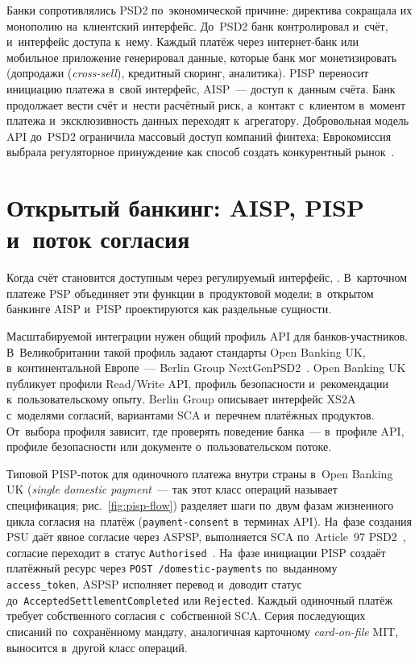Банки сопротивлялись PSD2 по~экономической причине: директива сокращала их
монополию на~клиентский интерфейс. До~PSD2 банк контролировал и~счёт,
и~интерфейс доступа к~нему. Каждый платёж через интернет-банк или мобильное
приложение генерировал данные, которые банк мог монетизировать (допродажи
(\textit{cross-sell}), кредитный скоринг, аналитика). PISP переносит инициацию
платежа в~свой интерфейс,
AISP~--- доступ к~данным счёта. Банк продолжает вести счёт и~нести расчётный
риск, а~контакт с~клиентом в~момент платежа и~эксклюзивность данных переходят
к~агрегатору. Добровольная модель API до~PSD2 ограничила массовый доступ
компаний финтеха; Еврокомиссия выбрала регуляторное принуждение
как способ создать конкурентный рынок~\cite{psd2}.

\section{Открытый банкинг: AISP, PISP и~поток согласия}\label{sec:open-banking}

Когда счёт становится доступным через регулируемый интерфейс,
. В~карточном платеже PSP
объединяет эти функции в~продуктовой модели; в~открытом банкинге AISP и~PISP
проектируются как раздельные сущности.

Масштабируемой интеграции нужен общий профиль API для банков-участников.
В~Великобритании такой профиль
задают стандарты Open Banking UK, в~континентальной Европе~--- Berlin Group
NextGenPSD2~\cite{openbanking-uk,berlin-group}. Open Banking UK публикует
профили Read/Write API, профиль безопасности и~рекомендации к~пользовательскому
опыту. Berlin Group описывает интерфейс XS2A с~моделями согласий, вариантами SCA
и~перечнем платёжных продуктов. От~выбора профиля зависит, где проверять
поведение банка~--- в~профиле API, профиле безопасности или документе
о~пользовательском потоке.

Типовой PISP-поток для одиночного платежа внутри страны в~Open Banking UK
(\textit{single domestic payment}~--- так этот класс операций называет
спецификация; рис.~\ref{fig:pisp-flow}) разделяет шаги по~двум фазам жизненного
цикла согласия на~платёж (\texttt{payment-consent} в~терминах API). На~фазе
создания PSU даёт явное согласие через ASPSP, выполняется SCA по~Article~97
PSD2~\cite{psd2}, согласие переходит в~статус
\texttt{Authorised}~\cite{openbanking-uk-payment-initiation-profile}. На~фазе
инициации PISP создаёт платёжный ресурс через \texttt{POST~/domestic-payments}
по~выданному \texttt{access\_token}, ASPSP исполняет перевод и~доводит статус
до~\texttt{AcceptedSettlementCompleted} или \texttt{Rejected}. Каждый одиночный платёж
требует собственного согласия с~собственной SCA. Серия последующих списаний
по~сохранённому мандату, аналогичная карточному \textit{card-on-file} MIT,
выносится в~другой класс операций.

